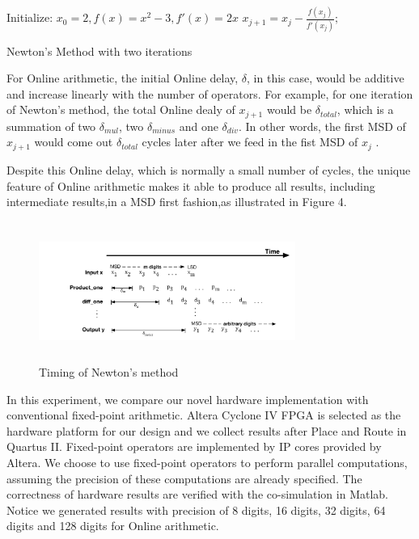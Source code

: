 \documentclass{sig-alternate}
\begin{document}
  	\begin{algorithm}
  		\begin{algorithmic}[1]
  			\State Initialize: $x_{0}=2, f(x)=x^{2}-3, f'(x)=2x$	
  			\State $x_{j+1}=x_{j}-\frac{f(x_j)}{f'(x_j)};$
  			\EndFor
  		\end{algorithmic}
  		\caption{Newton's Method with two iterations}
  		\label{alg:algorithm3}
  	\end{algorithm}
For Online arithmetic, the initial Online delay, $\delta$, in this case, would be additive and increase linearly with the number of operators. For example, for one iteration of Newton's method, the total Online dealy of $x_{j+1}$ would be $\delta_{total}$, which is a summation of two $\delta_{mul}$, two $\delta_{minus}$ and one $\delta_{div}$. In other words, the first MSD of $x_{j+1}$ would come out $\delta_{total}$ cycles later after we feed in the fist MSD of $x_{j}$ .

Despite this Online delay, which is normally a small number of cycles, the unique feature of Online arithmetic makes it able to produce all results, including intermediate results,in a MSD first fashion,as illustrated in Figure 4. 
\vspace{-10pt}
\begin{figure} [ht]
	\centering
	\includegraphics[width=3.3in,height=1.8in]{newton_timing}
	\caption{Timing of Newton's method}
\end{figure}


In this experiment, we compare our novel hardware implementation with conventional fixed-point arithmetic.
Altera Cyclone IV FPGA is selected as the hardware platform for our design and we collect results after Place and Route in Quartus II.   
Fixed-point operators are implemented by IP cores provided by Altera. We choose to use fixed-point operators to perform parallel computations, assuming the precision of these computations are already specified. The correctness of hardware results are verified with the co-simulation in Matlab. Notice we generated results with precision of 8 digits, 16 digits, 32 digits, 64 digits and 128 digits for Online arithmetic. 
\end{document}
